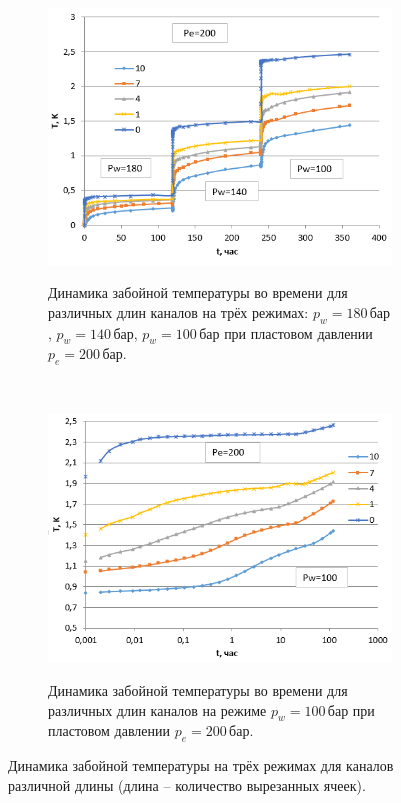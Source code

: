 \begin{figure}[H]
	\begin{subfigure}[b]{0.5\textwidth}
	\centering
	\includegraphics[width=1\textwidth]{pic/temp_tunnels.png}
	\label{pic:temp-tunnels}
	\caption{Динамика забойной температуры во времени для различных длин каналов на трёх режимах: $p_w=180\,\text{бар}$, $p_w=140\,\text{бар}$, $p_w=100\,\text{бар}$ при пластовом давлении $p_e=200\,\text{бар}$.}
	\end{subfigure}
~
	\begin{subfigure}[b]{0.5\textwidth}
		\centering
		\includegraphics[width=1\textwidth]{pic/temp_tunnels1.png}
		\label{pic:temp-tunnels1}
		\caption{Динамика забойной температуры во времени для различных длин каналов на режиме $p_w=100\,\text{бар}$ при пластовом давлении $p_e=200\,\text{бар}$.}
	\end{subfigure}

	\caption{Динамика забойной температуры на трёх режимах для каналов различной длины (длина -- количество вырезанных ячеек).}
	\label{pic:tunnels}
\end{figure}

